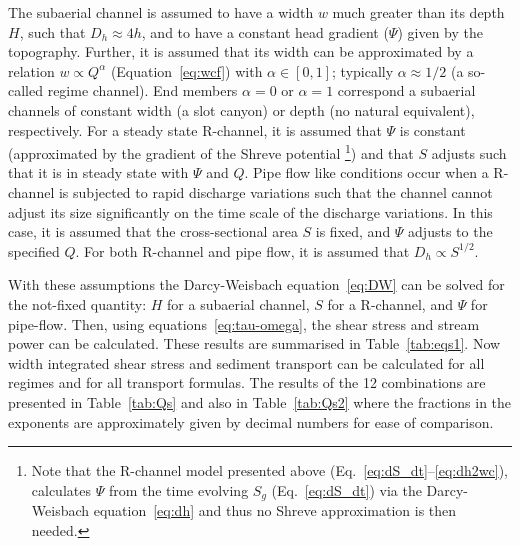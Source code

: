\documentclass[draft]{agujournal2019}
\begin{document}
The  subaerial channel is assumed to have a width $w$ much greater than its depth $H$, such that $D_h\approx 4h$, and to have a constant head gradient ($\Psi$) given by the topography.
Further, it is  assumed that its width can be approximated by a relation $w \propto Q^\alpha$ (Equation~\ref{eq:wcf}) with $\alpha\in [0,1]$; typically $\alpha \approx 1/2$ (a so-called regime channel).
End members $\alpha=0$ or $\alpha=1$ correspond a  subaerial channels of constant width (a slot canyon) or depth (no natural equivalent), respectively.
% 
For a steady state R-channel, it is assumed that  $\Psi$ is constant (approximated by the gradient of the Shreve \citeyear{shreve1972} potential \footnote{Note that the R-channel model presented above (Eq.~\eqref{eq:dS_dt}--\eqref{eq:dh2wc}), calculates $\Psi$ from the time evolving $S_g$ (Eq.~\eqref{eq:dS_dt}) via the Darcy-Weisbach equation~\eqref{eq:dh} and thus no Shreve approximation is then needed.}) and that $S$ adjusts such that it is in steady state with $\Psi$ and $Q$.
% 
Pipe flow like conditions occur when a R-channel is subjected to rapid discharge variations such that the channel cannot adjust its size significantly on the time scale of the discharge variations.
In this case, it is assumed that the cross-sectional area $S$ is fixed, and $\Psi$ adjusts to the specified $Q$.
For both R-channel and pipe flow, it is assumed that $D_h \propto S^{1/2}$.

With these assumptions the Darcy-Weisbach equation~\eqref{eq:DW} can be solved for the not-fixed quantity: $H$ for a  subaerial channel, $S$ for a R-channel, and $\Psi$ for pipe-flow.
Then, using equations~\eqref{eq:tau-omega}, the shear stress and stream power can be calculated.
These results are summarised in Table~\ref{tab:eqs1}.
Now width integrated shear stress and sediment transport can be calculated for all regimes and for all transport formulas.  The results of the 12 combinations are presented in Table~\ref{tab:Qs} and also in Table~\ref{tab:Qs2} where the fractions in the exponents are approximately given by decimal numbers for ease of comparison.
\end{document}
